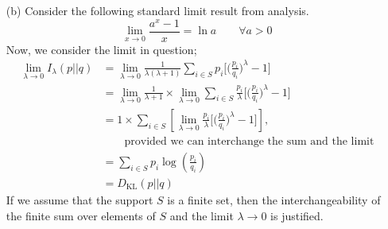 \documentclass[12pt]{article}
\begin{document}
\begin{enumerate}
\begin{solution}
\begin{enumerate}
	
	\item[(b)] Consider the following standard limit result from analysis.
	$$\lim_{x \rightarrow 0}\frac{a^x - 1}{x} = \ln a \qquad \forall a>0$$
	Now, we consider the limit in question;
	\begin{align*}
		\lim_{\lambda \rightarrow 0} I_\lambda\left(p || q\right) & = \lim_{\lambda \rightarrow 0}\frac{1}{\lambda(\lambda + 1)} \sum_{i \in S}p_i \bigg[\bigg(\frac{p_i}{q_i} \bigg)^\lambda - 1\bigg]\\
		& = \lim_{\lambda \rightarrow 0}\frac{1}{\lambda+1} \times \lim_{\lambda \rightarrow 0}\sum_{i \in S}\frac{p_i}{\lambda} \bigg[\bigg(\frac{p_i}{q_i} \bigg)^\lambda - 1\bigg]\\
		& = 1 \times \sum_{i \in S}\left[\lim_{\lambda \rightarrow 0} \frac{p_i}{\lambda} \bigg[\bigg(\frac{p_i}{q_i} \bigg)^\lambda - 1\bigg]\right],\\
		& \qquad \text{provided we can interchange the sum and the limit}\\
		& = \sum_{i \in S} p_i \log\left(\frac{p_i}{q_i}\right)\\
		& = D_{\text{KL}}\left(p || q\right)
	\end{align*}
	If we assume that the support $S$ is a finite set, then the interchangeability of the finite sum over elements of $S$ and the limit $\lambda\rightarrow 0$ is justified.  
	

\end{enumerate}
\end{solution}
\end{enumerate}
\end{document}
